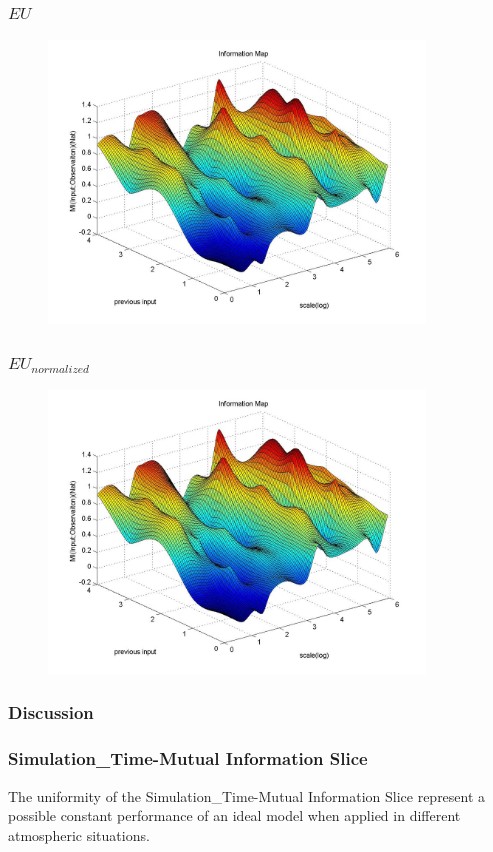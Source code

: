 \documentclass{beamer}
\begin{document}
\begin{CJK}{UTF8}{gkai}
\begin{frame}
\frametitle{$EU$}
\begin{figure}[htbp]
\centering
\includegraphics[width=10cm]{1.jpg}
\end{figure} 
\end{frame}

\begin{frame}
\frametitle{$EU_{normalized}$}
\begin{figure}[htbp]
\centering
\includegraphics[width=10cm]{1.jpg}
\end{figure} 
\end{frame}

\begin{frame}
\frametitle{Discussion}
\end{frame}


\begin{frame}
\frametitle{Simulation\_{Time}-Mutual Information Slice}
The uniformity of the Simulation\_{Time}-Mutual Information Slice represent a possible constant performance of an ideal model when applied in different atmospheric situations.
\end{frame}


\end{CJK}
\end{document}
